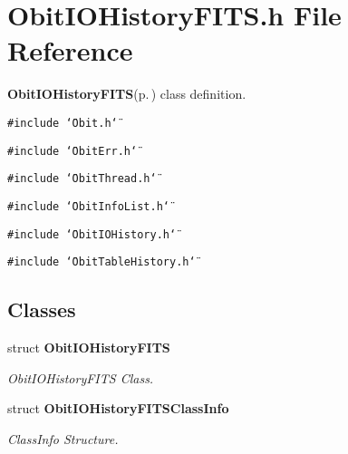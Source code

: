 \section{Obit\-IOHistory\-FITS.h File Reference}
\label{ObitIOHistoryFITS_8h}
{\bf Obit\-IOHistory\-FITS}{\rm (p.\,\pageref{structObitIOHistoryFITS})} class definition. 

{\tt \#include \char`\"{}Obit.h\char`\"{}}\par
{\tt \#include \char`\"{}Obit\-Err.h\char`\"{}}\par
{\tt \#include \char`\"{}Obit\-Thread.h\char`\"{}}\par
{\tt \#include \char`\"{}Obit\-Info\-List.h\char`\"{}}\par
{\tt \#include \char`\"{}Obit\-IOHistory.h\char`\"{}}\par
{\tt \#include \char`\"{}Obit\-Table\-History.h\char`\"{}}\par
\subsection*{Classes}
\begin{CompactItemize}
\item 
struct {\bf Obit\-IOHistory\-FITS}
\begin{CompactList}\small\item\em Obit\-IOHistory\-FITS Class. \item\end{CompactList}\item 
struct {\bf Obit\-IOHistory\-FITSClass\-Info}
\begin{CompactList}\small\item\em Class\-Info Structure. \item\end{CompactList}\end{CompactItemize}
